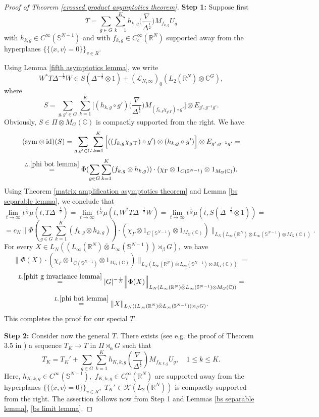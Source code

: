\documentclass{amsart}
\begin{document}
\begin{proof}[Proof of Theorem \ref{crossed product asymptotics theorem}] {\bf Step 1:} Suppose first
$$T=\sum_{g\in G}\sum_{k=1}^Kh_{k,g}\big(\frac{\nabla}{\Delta^{\frac12}}\big)M_{f_{k,g}}U_g$$
with $h_{k,g}\in C^{\infty}(\mathbb{S}^{N-1})$ and with $f_{k,g}\in C^{\infty}_c(\mathbb{R}^N)$ supported away from the hyperplanes $\{\{\langle x,v\rangle=0\}\}_{v\in R}.$

Using Lemma \ref{fifth asymptotics lemma}, we write
$$W^{\ast}T\Delta^{-\frac12}W\in S(\Delta^{-\frac12}\otimes 1)+(\mathcal{L}_{N,\infty})_0(L_2(\mathbb{R}^N)\otimes\mathbb{C}^G),$$
where
$$S=\sum_{g,g'\in G}\sum_{k=1}^K\Big[(h_{k,g}\circ g')
\big(\frac{\nabla}{\Delta^{\frac12}}\big)M_{(f_{k,g}\chi_{g'\Gamma})\circ g'}\Big]\otimes E_{g',g^{-1}g'}.$$
Obviously, $S\in\Pi\otimes M_G(\mathbb{C})$ is compactly supported from the right. We have
$$({\rm sym}\otimes{\rm id})(S)=\sum_{g,g'\in G}\sum_{k=1}^K\Big[((f_{k,g}\chi_{g'\Gamma})\circ g')\otimes(h_{k,g}\circ g')\Big]\otimes E_{g',g^{-1}g'}=$$
$$\stackrel{L.\ref{phi bot lemma}}{=}\Phi(\sum_{g\in G}\sum_{k=1}^K(f_{k,g}\otimes h_{k,g}))\cdot(\chi_{\Gamma}\otimes1_{C(\mathbb{S}^{N-1})}\otimes 1_{M_G(\mathbb{C})}).$$
Using Theorem \ref{matrix amplification asymptotics theorem} and Lemma \ref{bs separable lemma}, we conclude that
$$\lim_{t\to\infty}t^{\frac1N}\mu(t,T\Delta^{-\frac12})=\lim_{t\to\infty}t^{\frac1N}\mu(t,W^{\ast}T\Delta^{-\frac12}W)=\lim_{t\to\infty}t^{\frac1N}\mu(t,S(\Delta^{-\frac12}\otimes 1))=$$
$$=c_N\Big\|\Phi(\sum_{g\in G}\sum_{k=1}^K(f_{k,g}\otimes h_{k,g}))\cdot(\chi_{\Gamma}\otimes1_{C(\mathbb{S}^{N-1})}\otimes 1_{M_G(\mathbb{C})})\Big\|_{L_N(L_{\infty}(\mathbb{R}^N)\bar{\otimes}L_{\infty}(\mathbb{S}^{N-1})\otimes M_G(\mathbb{C}))}.$$
For every $X\in L_N((L_{\infty}(\mathbb{R}^N)\bar{\otimes}L_{\infty}(\mathbb{S}^{N-1}))\rtimes_{\beta} G),$ we have
$$\Big\|\Phi(X)\cdot(\chi_{\Gamma}\otimes1_{C(\mathbb{S}^{N-1})}\otimes 1_{M_G(\mathbb{C})})\Big\|_{L_N(L_{\infty}(\mathbb{R}^N)\bar{\otimes}L_{\infty}(\mathbb{S}^{N-1})\otimes M_G(\mathbb{C}))}=$$
$$\stackrel{L.\ref{phit g invariance lemma}}{=}|G|^{-\frac1N}\Big\|\Phi(X)\Big\|_{L_N(L_{\infty}(\mathbb{R}^N)\bar{\otimes}L_{\infty}(\mathbb{S}^{N-1})\otimes M_G(\mathbb{C}))}=$$
$$\stackrel{L.\ref{phi bot lemma}}{=}\|X\|_{L_N((L_{\infty}(\mathbb{R}^N)\bar{\otimes}L_{\infty}(\mathbb{S}^{N-1}))\rtimes_{\beta} G)}.$$
This completes the proof for our special $T.$

{\bf Step 2:} Consider now the general $T.$ There exists (see e.g. the proof of Theorem 3.5 in \cite{DAO3}) a sequence $T_K\to T$ in $\Pi\rtimes_{\alpha}G$ such that
$$T_K=T_K'+\sum_{g\in G}\sum_{k=1}^Kh_{K,k,g}(\frac{\nabla}{\Delta^{\frac12}})M_{f_{K,k,g}}U_g,\quad 1\leq k\leq K.$$
Here, $h_{K,k,g}\in C^{\infty}(\mathbb{S}^{N-1}),$ $f_{K,k,g}\in C^{\infty}_c(\mathbb{R}^N)$ are supported away from the hyperplanes $\{\{\langle x,v\rangle=0\}\}_{v\in R},$ $T_K'\in\mathcal{K}(L_2(\mathbb{R}^N))$ is compactly supported from the right. The assertion follows now from Step 1 and Lemmas \ref{bs separable lemma}, \ref{bs limit lemma}.
\end{proof}



\end{document}
